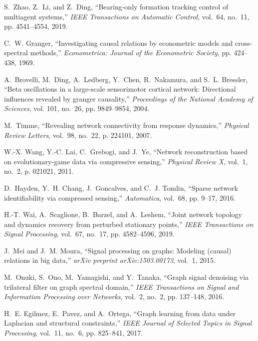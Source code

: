 \documentclass[12pt,journal,draftclsnofoot,onecolumn]{IEEEtran}
\begin{document}
\begin{thebibliography}{10}
S.~Zhao, Z.~Li, and Z.~Ding, ``Bearing-only formation tracking control of
  multiagent systems,'' \emph{IEEE Transactions on Automatic Control}, vol.~64,
  no.~11, pp. 4541--4554, 2019.

C.~W. Granger, ``Investigating causal relations by econometric models and
  cross-spectral methods,'' \emph{Econometrica: Journal of the Econometric
  Society}, pp. 424--438, 1969.

A.~Brovelli, M.~Ding, A.~Ledberg, Y.~Chen, R.~Nakamura, and S.~L. Bressler,
  ``Beta oscillations in a large-scale sensorimotor cortical network:
  Directional influences revealed by granger causality,'' \emph{Proceedings of
  the National Academy of Sciences}, vol. 101, no.~26, pp. 9849--9854, 2004.

M.~Timme, ``Revealing network connectivity from response dynamics,''
  \emph{Physical Review Letters}, vol.~98, no.~22, p. 224101, 2007.

W.-X. Wang, Y.-C. Lai, C.~Grebogi, and J.~Ye, ``Network reconstruction based on
  evolutionary-game data via compressive sensing,'' \emph{Physical Review X},
  vol.~1, no.~2, p. 021021, 2011.

D.~Hayden, Y.~H. Chang, J.~Goncalves, and C.~J. Tomlin, ``Sparse network
  identifiability via compressed sensing,'' \emph{Automatica}, vol.~68, pp.
  9--17, 2016.

H.-T. Wai, A.~Scaglione, B.~Barzel, and A.~Leshem, ``Joint network topology and
  dynamics recovery from perturbed stationary points,'' \emph{IEEE Transactions
  on Signal Processing}, vol.~67, no.~17, pp. 4582--4596, 2019.

J.~Mei and J.~M. Moura, ``Signal processing on graphs: Modeling (causal)
  relations in big data,'' \emph{arXiv preprint arXiv:1503.00173}, vol.~1,
  2015.

M.~Onuki, S.~Ono, M.~Yamagishi, and Y.~Tanaka, ``Graph signal denoising via
  trilateral filter on graph spectral domain,'' \emph{IEEE Transactions on
  Signal and Information Processing over Networks}, vol.~2, no.~2, pp.
  137--148, 2016.

H.~E. Egilmez, E.~Pavez, and A.~Ortega, ``Graph learning from data under
  {Laplacian} and structural constraints,'' \emph{IEEE Journal of Selected
  Topics in Signal Processing}, vol.~11, no.~6, pp. 825--841, 2017.


\end{thebibliography}
\end{document}
